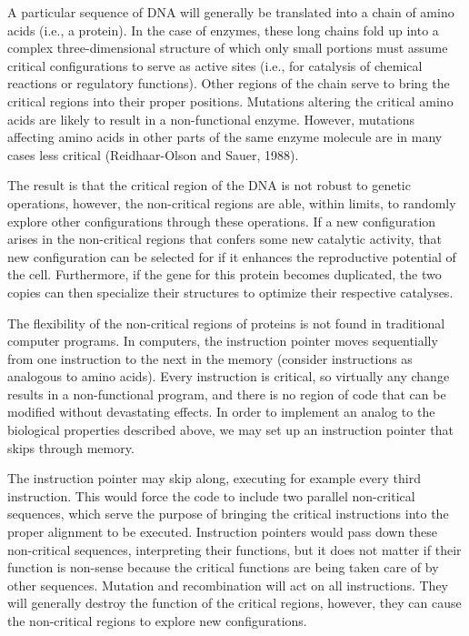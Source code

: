 A particular sequence of DNA will generally be translated into a chain of
amino acids (i.e., a protein).  In the case of enzymes, these long chains fold
up into a complex three-dimensional structure of which only small portions
must assume critical configurations to serve as active sites (i.e., for
catalysis of chemical reactions or regulatory functions).  Other regions of
the chain serve to bring the critical regions into their proper positions.
Mutations altering the critical amino acids are likely to result in a
non-functional enzyme.  However, mutations affecting amino acids in other
parts of the same enzyme molecule are in many cases less critical
(Reidhaar-Olson and Sauer, 1988).

The result is that the critical region of the DNA is not robust to genetic
operations, however, the non-critical regions are able, within limits, to
randomly explore other configurations through these operations.  If a new
configuration arises in the non-critical regions that confers some new
catalytic activity, that new configuration can be selected for if it enhances
the reproductive potential of the cell.  Furthermore, if the gene for this
protein becomes duplicated, the two copies can then specialize their
structures to optimize their respective catalyses.

The flexibility of the non-critical regions of proteins is not found in
traditional computer programs.  In computers, the instruction pointer
moves sequentially from one instruction to the next in the memory (consider
instructions as analogous to amino acids).  Every instruction is critical,
so virtually any change results in a non-functional program, and there is no
region of code that can be modified without devastating effects.  In order
to implement an analog to the biological properties described above, we may
set up an instruction pointer that skips through memory.

The instruction pointer may skip along, executing for example every third
instruction.  This would force the code to include two parallel non-critical
sequences, which serve the purpose of bringing the critical instructions into
the proper alignment to be executed.  Instruction pointers would pass down
these non-critical sequences, interpreting their functions, but it does not
matter if their function is non-sense because the critical functions are being
taken care of by other sequences.  Mutation and recombination will act on all
instructions.  They will generally destroy the function of the critical
regions, however, they can cause the non-critical regions to explore new
configurations.


